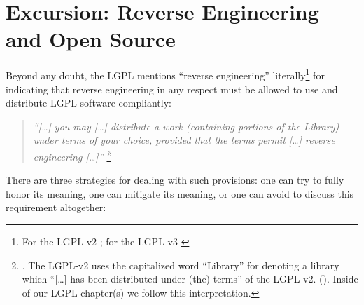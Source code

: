 %
%
%
%
%



\section{Excursion: Reverse Engineering and Open Source}

Beyond any doubt, the LGPL mentions \enquote{reverse engineering}
literally\footnote{For the LGPL-v2 \cite[cf.][\nopage wp., 
§6]{Lgpl21OsiLicense1999a}; for the LGPL-v3 \cite[cf.][\nopage wp., 
§4]{Lgpl30OsiLicense2007a} } for indicating that reverse engineering in any
respect must be allowed to use and distribute LGPL software compliantly:

\begin{quote}\noindent\emph{\enquote{[\ldots] you may [\ldots] distribute a work
(containing portions of the Library) under terms of your choice, provided that
the terms permit [\ldots] \emph{reverse engineering} [\ldots]}
\footnote{\cite[cf.][\nopage wp, §6]{Lgpl21OsiLicense1999a}. The LGPL-v2 uses
the capitalized word \enquote{Library} for denoting a library which
\enquote{[\ldots] has been distributed under (the) terms} of the LGPL-v2.
(\cite[cf.][\nopage wp, §0]{Lgpl21OsiLicense1999a}). Inside of our LGPL
chapter(s) we follow this interpretation. } }
\end{quote}

There are three strategies for dealing with such provisions: one can try to
fully honor its meaning, one can mitigate its meaning, or one can avoid to
discuss this requirement altogether:

